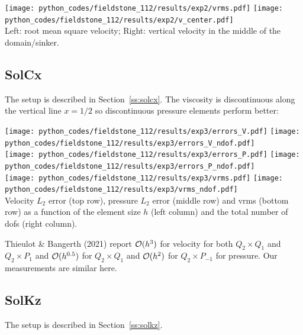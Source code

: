 \begin{center}
\texttt{[image: python\_codes/fieldstone\_112/results/exp2/vrms.pdf]}
\texttt{[image: python\_codes/fieldstone\_112/results/exp2/v\_center.pdf]}\\
{\captionfont Left: root mean square velocity; Right: vertical velocity in the middle of the domain/sinker.}
\end{center}

\newpage
\subsection*{SolCx}

The setup is described in Section~\ref{ss:solcx}. The viscosity is discontinuous 
along the vertical line $x=1/2$ so discontinuous pressure elements perform better:

\begin{center}
\texttt{[image: python\_codes/fieldstone\_112/results/exp3/errors\_V.pdf]}
\texttt{[image: python\_codes/fieldstone\_112/results/exp3/errors\_V\_ndof.pdf]}\\
\texttt{[image: python\_codes/fieldstone\_112/results/exp3/errors\_P.pdf]}
\texttt{[image: python\_codes/fieldstone\_112/results/exp3/errors\_P\_ndof.pdf]}\\
\texttt{[image: python\_codes/fieldstone\_112/results/exp3/vrms.pdf]}
\texttt{[image: python\_codes/fieldstone\_112/results/exp3/vrms\_ndof.pdf]}\\
{\captionfont Velocity $L_2$ error (top row), pressure $L_2$ error (middle row) and vrms (bottom row) 
as a function of the element size $h$ (left column) and the total number of dofs (right column).}
\end{center}

Thieulot \& Bangerth (2021) \cite{thba22} report ${\cal O}(h^3)$ for velocity for both $Q_2\times Q_1$ and $Q_2\times P_1$
and ${\cal O}(h^{0.5})$ for $Q_2\times Q_1$ and  ${\cal O}(h^{2})$ for $Q_2\times P_{-1}$ for pressure. 
Our measurements are similar here.

\newpage
\subsection*{SolKz}

The setup is described in Section~\ref{ss:solkz}. 

